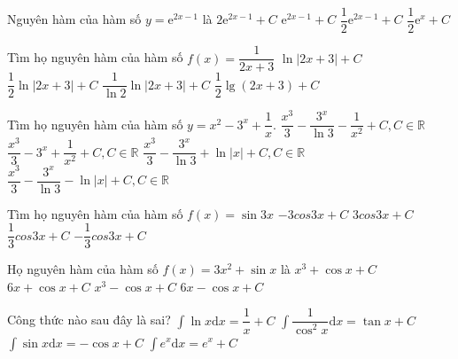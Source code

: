 \begin{ex}
	Nguyên hàm của hàm số $ y=\mathrm{e}^{2x-1}$ là
	\choice
	{${2}{{\mathrm{e}}^{2x-1}}+C$}
	{${\mathrm{e}}^{2x-1}+C$}
	{\True $\dfrac{1}{2}{{\mathrm{e}}^{2x-1}}+C$}
	{$\dfrac{1}{2}{{\mathrm{e}}^x}+C$}
\end{ex}
\begin{ex}
	Tìm họ nguyên hàm của hàm số $ f(x)=\dfrac{1}{2x+3}$
	\choice
	{$\ln \left| 2x+3\right|+C$}
	{\True $\dfrac{1}{2}\ln \left| 2x+3\right|+C$}
	{$\dfrac{1}{\ln 2}\ln \left| 2x+3\right|+C$}
	{$\dfrac{1}{2}\lg\left(2x+3\right)+C$}
	\loigiai{}
\end{ex}
\begin{ex}
	Tìm họ nguyên hàm của hàm số $ y=x^2-3^x+\dfrac{1}{x}$.
	\choice
	{$\dfrac{x^3}{3}-\dfrac{3^x}{\ln 3}-\dfrac{1}{x^2}+C,C\in\mathbb{R}$}
	{$\dfrac{x^3}{3}-3^x+\dfrac{1}{x^2}+C,C\in\mathbb{R}$}
	{\True $\dfrac{x^3}{3}-\dfrac{3^x}{\ln 3}+\ln \left|x\right|+C,C\in\mathbb{R}$}
	{$\dfrac{x^3}{3}-\dfrac{3^x}{\ln 3}-\ln \left|x\right|+C,C\in\mathbb{R}$}
\end{ex}
\begin{ex}
	Tìm họ nguyên hàm của hàm số $ f(x)=\sin 3x$
	\choice
	{$-3{cos}3x+C$}
	{${3cos}3x+C$}
	{$\dfrac{1}{3}{cos}3x+C$}
	{\True $-\dfrac{1}{3}{cos}3x+C$}
\end{ex}
\begin{ex}
	Họ nguyên hàm của hàm số $f(x)=3x^2+\sin x$ là
	\choice
	{$x^3+\cos x+C$}
	{$6x+\cos x+C$}
	{\True $x^3-\cos x+C$}
	{$6x-\cos x+C$}
\end{ex}
\begin{ex}
	Công thức nào sau đây là sai?
	\choice
	{\True $\displaystyle\int{\ln x}\mathrm{d}x=\dfrac{1}{x}+C$}
	{$\displaystyle\int{\dfrac{1}{\cos^2x}}\mathrm{d}x=\tan x+C$}
	{$\displaystyle\int{\sin x}\mathrm{d}x=-\cos x+C$}
	{$\displaystyle\int{{e}^x}\mathrm{d}x={e}^x+C$}
\end{ex}
